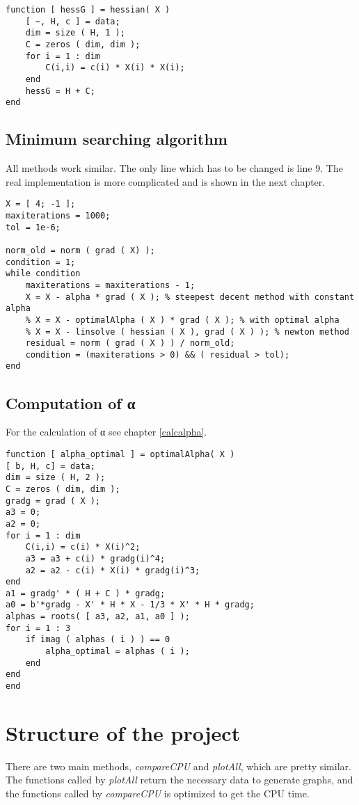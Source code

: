 \documentclass[a4paper,12pt]{article}
\newcommand{\code}[1]{\textit{#1}}
\begin{document}
\begin{lstlisting}
function [ hessG ] = hessian( X )
	[ ~, H, c ] = data;
	dim = size ( H, 1 );
	C = zeros ( dim, dim );
	for i = 1 : dim
		C(i,i) = c(i) * X(i) * X(i);
	end
	hessG = H + C;
end
\end{lstlisting}

\subsection{Minimum searching algorithm}
All methods work similar. 
The only line which has to be changed is line 9.
The real implementation is more complicated and is shown in the next chapter.
\begin{lstlisting}
X = [ 4; -1 ];
maxiterations = 1000;
tol = 1e-6;

norm_old = norm ( grad ( X) );
condition = 1;
while condition
	maxiterations = maxiterations - 1;
	X = X - alpha * grad ( X ); % steepest decent method with constant alpha
	% X = X - optimalAlpha ( X ) * grad ( X ); % with optimal alpha
	% X = X - linsolve ( hessian ( X ), grad ( X ) ); % newton method
	residual = norm ( grad ( X ) ) / norm_old;
	condition = (maxiterations > 0) && ( residual > tol);
end
\end{lstlisting}

\subsection{Computation of α}
For the calculation of α see chapter \ref{calcalpha}.
\begin{lstlisting}
function [ alpha_optimal ] = optimalAlpha( X )
[ b, H, c] = data;
dim = size ( H, 2 );
C = zeros ( dim, dim );
gradg = grad ( X );
a3 = 0;
a2 = 0;
for i = 1 : dim
	C(i,i) = c(i) * X(i)^2;
	a3 = a3 + c(i) * gradg(i)^4;
	a2 = a2 - c(i) * X(i) * gradg(i)^3;
end
a1 = gradg' * ( H + C ) * gradg;
a0 = b'*gradg - X' * H * X - 1/3 * X' * H * gradg;
alphas = roots( [ a3, a2, a1, a0 ] );
for i = 1 : 3
	if imag ( alphas ( i ) ) == 0
		alpha_optimal = alphas ( i );
	end
end
end
\end{lstlisting}
 
\section{Structure of the project}
There are two main methods, \code{compareCPU} and \code{plotAll}, which are pretty similar.
The functions called by \code{plotAll} return the necessary data to generate graphs, and the functions called by \code{compareCPU} is optimized to get the CPU time.
\end{document}
